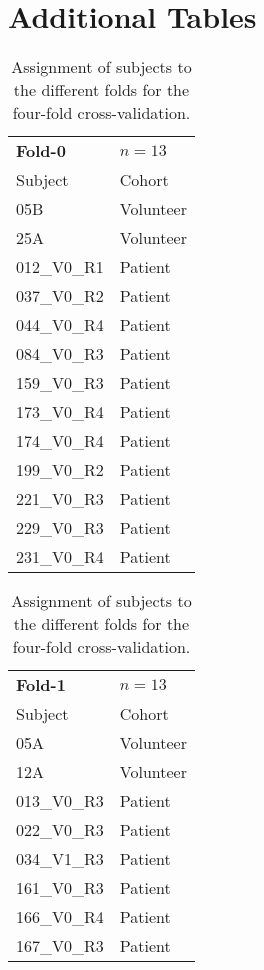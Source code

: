 \chapter{Additional Tables} %

\begin{table}[htbp]
   \centering
   \caption[Subject Assignment]{Assignment of subjects to the different folds for the four-fold cross-validation.}
   \begin{tabular}{p{3cm}l}
      \toprule
      \textbf{Fold-0} & $n = 13$ \\      
      Subject & Cohort \\
      \midrule
      05B           & Volunteer \\
      25A           & Volunteer \\
      012\_V0\_R1  & Patient   \\
      037\_V0\_R2  & Patient   \\
      044\_V0\_R4  & Patient   \\
      084\_V0\_R3  & Patient   \\
      159\_V0\_R3 & Patient   \\
      173\_V0\_R4 & Patient   \\
      174\_V0\_R4 & Patient   \\
      199\_V0\_R2 & Patient   \\
      221\_V0\_R3 & Patient   \\
      229\_V0\_R3 & Patient   \\
      231\_V0\_R4 & Patient   \\
      \bottomrule
   \end{tabular}
   \begin{tabular}{p{3cm}l}      
      \toprule
      \textbf{Fold-1} & $n = 13$ \\
      Subject & Cohort \\
      \midrule
      05A           & Volunteer \\
      12A           & Volunteer \\
      013\_V0\_R3  & Patient   \\
      022\_V0\_R3  & Patient   \\
      034\_V1\_R3  & Patient   \\
      161\_V0\_R3 & Patient   \\
      166\_V0\_R4 & Patient   \\
      167\_V0\_R3 & Patient   \\

\end{tabular}
\end{table}

